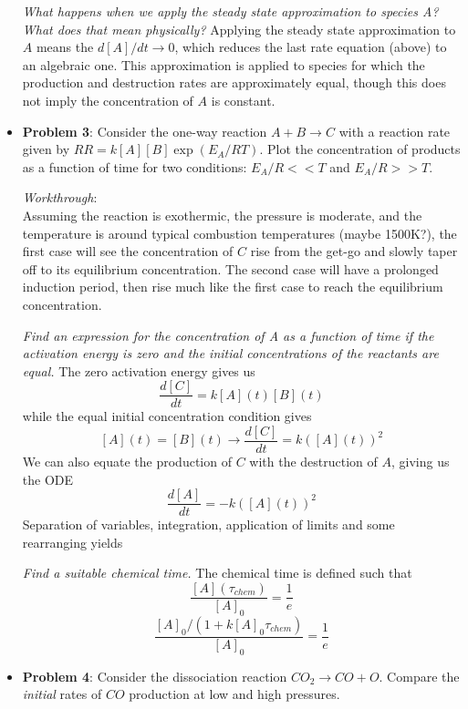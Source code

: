 \documentclass[11pt]{article}
\newcommand{\Item}[1]{\item \textbf{#1}:}
\newcommand{\CenteredBoxed}[1]{\begin{center}\boxed{#1}\end{center}}
\newcommand{\Problem}[1]{\Item{Problem #1}}
\begin{document}
\begin{itemize}
\emph{What happens when we apply the steady state approximation to species A? What does that mean physically?} Applying the steady state approximation to $A$ means the $d[A]/dt\to0$, which reduces the last rate equation (above) to an algebraic one. This approximation is applied to species for which the production and destruction rates are approximately equal, though this does not imply the concentration of $A$ is constant.

\Problem{3} Consider the one-way reaction $A+B\to C$ with a reaction rate given by $RR = k[A][B]\exp\left(E_A/RT\right)$. Plot the concentration of products as a function of time for two conditions: $E_A/R <<T$ and $E_A/R >>T$.

\emph{Workthrough}:\\
Assuming the reaction is exothermic, the pressure is moderate, and the temperature is around typical combustion temperatures (maybe 1500K?), the first case will see the concentration of $C$ rise from the get-go and slowly taper off to its equilibrium concentration. The second case will have a prolonged induction period, then rise much like the first case to reach the equilibrium concentration.

\emph{Find an expression for the concentration of A as a function of time if the activation energy is zero and the initial concentrations of the reactants are equal.} The zero activation energy gives us
$$\frac{d[C]}{dt} = k[A](t)[B](t)$$
while the equal initial concentration condition gives
$$[A](t)=[B](t)\to\frac{d[C]}{dt} = k\left([A](t)\right)^2$$
We can also equate the production of $C$ with the destruction of $A$, giving us the ODE
$$\frac{d[A]}{dt} = -k\left([A](t)\right)^2$$
Separation of variables, integration, application of limits and some rearranging yields
\CenteredBoxed{[A](t) = \frac{[A]_0}{1+k[A]_0t}}

\emph{Find a suitable chemical time.} The chemical time is defined such that 
$$\frac{[A](\tau_{chem})}{[A]_0}=\frac{1}{e}$$
$$\frac{[A]_0/(1+k[A]_0\tau_{chem})}{[A]_0}=\frac{1}{e}$$
\CenteredBoxed{\tau_{chem} = \frac{e-1}{k[A]_0}\propto\frac{1}{k[A]_0}}

\Problem{4} Consider the dissociation reaction $CO_2\to CO+O$. Compare the \emph{initial} rates of $CO$ production at low and high pressures.\\


\end{itemize}
\end{document}
